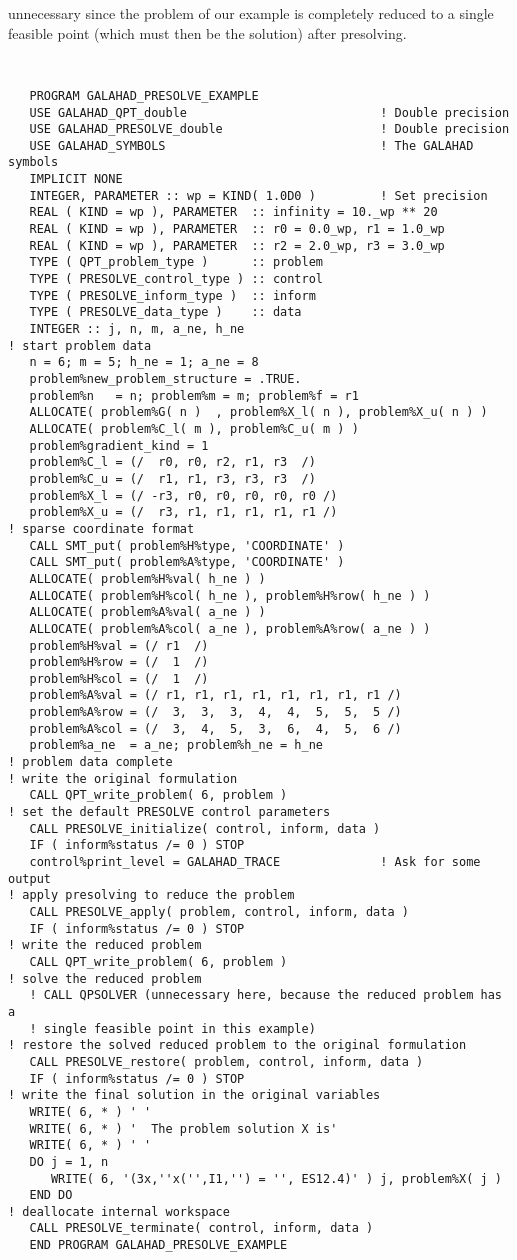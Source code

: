 \documentclass{galahad}
\begin{document}
unnecessary since the problem of our example is completely reduced to a single
feasible point (which must then be the solution) after presolving.
{\tt \small
\begin{verbatim}
   PROGRAM GALAHAD_PRESOLVE_EXAMPLE
   USE GALAHAD_QPT_double                           ! Double precision
   USE GALAHAD_PRESOLVE_double                      ! Double precision
   USE GALAHAD_SYMBOLS                              ! The GALAHAD symbols
   IMPLICIT NONE
   INTEGER, PARAMETER :: wp = KIND( 1.0D0 )         ! Set precision
   REAL ( KIND = wp ), PARAMETER  :: infinity = 10._wp ** 20
   REAL ( KIND = wp ), PARAMETER  :: r0 = 0.0_wp, r1 = 1.0_wp
   REAL ( KIND = wp ), PARAMETER  :: r2 = 2.0_wp, r3 = 3.0_wp
   TYPE ( QPT_problem_type )      :: problem
   TYPE ( PRESOLVE_control_type ) :: control
   TYPE ( PRESOLVE_inform_type )  :: inform
   TYPE ( PRESOLVE_data_type )    :: data
   INTEGER :: j, n, m, a_ne, h_ne
! start problem data
   n = 6; m = 5; h_ne = 1; a_ne = 8 
   problem%new_problem_structure = .TRUE.
   problem%n   = n; problem%m = m; problem%f = r1
   ALLOCATE( problem%G( n )  , problem%X_l( n ), problem%X_u( n ) )
   ALLOCATE( problem%C_l( m ), problem%C_u( m ) )
   problem%gradient_kind = 1
   problem%C_l = (/  r0, r0, r2, r1, r3  /)
   problem%C_u = (/  r1, r1, r3, r3, r3  /)
   problem%X_l = (/ -r3, r0, r0, r0, r0, r0 /)
   problem%X_u = (/  r3, r1, r1, r1, r1, r1 /)
! sparse coordinate format
   CALL SMT_put( problem%H%type, 'COORDINATE' )
   CALL SMT_put( problem%A%type, 'COORDINATE' )
   ALLOCATE( problem%H%val( h_ne ) )
   ALLOCATE( problem%H%col( h_ne ), problem%H%row( h_ne ) )
   ALLOCATE( problem%A%val( a_ne ) )
   ALLOCATE( problem%A%col( a_ne ), problem%A%row( a_ne ) )
   problem%H%val = (/ r1  /)
   problem%H%row = (/  1  /)
   problem%H%col = (/  1  /)
   problem%A%val = (/ r1, r1, r1, r1, r1, r1, r1, r1 /)
   problem%A%row = (/  3,  3,  3,  4,  4,  5,  5,  5 /)
   problem%A%col = (/  3,  4,  5,  3,  6,  4,  5,  6 /)
   problem%a_ne  = a_ne; problem%h_ne = h_ne
! problem data complete
! write the original formulation
   CALL QPT_write_problem( 6, problem ) 
! set the default PRESOLVE control parameters            
   CALL PRESOLVE_initialize( control, inform, data )
   IF ( inform%status /= 0 ) STOP
   control%print_level = GALAHAD_TRACE              ! Ask for some output
! apply presolving to reduce the problem
   CALL PRESOLVE_apply( problem, control, inform, data )
   IF ( inform%status /= 0 ) STOP
! write the reduced problem
   CALL QPT_write_problem( 6, problem ) 
! solve the reduced problem
   ! CALL QPSOLVER (unnecessary here, because the reduced problem has a 
   ! single feasible point in this example)
! restore the solved reduced problem to the original formulation
   CALL PRESOLVE_restore( problem, control, inform, data )
   IF ( inform%status /= 0 ) STOP
! write the final solution in the original variables
   WRITE( 6, * ) ' '
   WRITE( 6, * ) '  The problem solution X is'
   WRITE( 6, * ) ' '
   DO j = 1, n
      WRITE( 6, '(3x,''x('',I1,'') = '', ES12.4)' ) j, problem%X( j )
   END DO
! deallocate internal workspace
   CALL PRESOLVE_terminate( control, inform, data )
   END PROGRAM GALAHAD_PRESOLVE_EXAMPLE
\end{verbatim}
}
\end{document}
